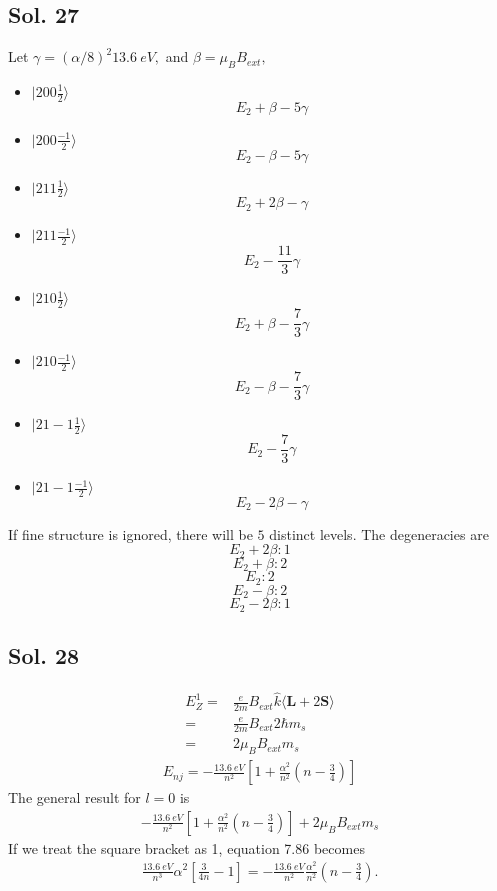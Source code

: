 \subsection*{Sol. 27}
Let $\gamma = (\alpha/8)^2\qty{13.6}{eV},$ and $\beta = \mu_BB_{ext},$
\begin{itemize}
    \item $|200\frac{1}{2}\rangle$
    $$
    E_2 + \beta - 5\gamma
    $$
    \item $|200\frac{-1}{2}\rangle$
    $$
    E_2 - \beta - 5\gamma
    $$
    \item $|211\frac{1}{2}\rangle$
    $$
    E_2 + 2\beta - \gamma
    $$
    \item $|211\frac{-1}{2}\rangle$
    $$
    E_2  - \frac{11}{3}\gamma
    $$
    \item $|210\frac{1}{2}\rangle$
    $$
    E_2 + \beta - \frac{7}{3}\gamma
    $$
    \item $|210\frac{-1}{2}\rangle$
    $$
    E_2 - \beta - \frac{7}{3}\gamma
    $$
    \item $|21-1\frac{1}{2}\rangle$
    $$
    E_2 - \frac{7}{3}\gamma
    $$
    \item $|21-1\frac{-1}{2}\rangle$
    $$
    E_2 - 2\beta - \gamma
    $$
\end{itemize}
If fine structure is ignored, there will be $5$ distinct levels. The degeneracies are
$$
E_2 + 2\beta: 1
$$
$$
E_2 + \beta: 2
$$
$$
E_2: 2
$$
$$
E_2 - \beta: 2
$$
$$
E_2 - 2\beta: 1
$$

\subsection*{Sol. 28}
\begin{align*}
    E^1_Z = &
    \frac{e}{2m}
    B_{ext}\hat k
    \langle \bm L+2\bm S\rangle\\
    =&\frac{e}{2m}B_{ext}2\hbar m_s\\
    =&2\mu_B B_{ext}m_s
\end{align*}
\begin{align*}
    E_{nj} = 
    -\frac{\qty{13.6}{eV}}{n^2}
    \left[
    1 + \frac{\alpha^2}{n^2}
    \left(
    n - \frac{3}{4}
    \right)
    \right]
\end{align*}
The general result for $l=0$ is 
\begin{align*}
    -\frac{\qty{13.6}{eV}}{n^2}
    \left[
    1 + \frac{\alpha^2}{n^2}
    \left(
    n - \frac{3}{4}
    \right)
    \right]
    +2\mu_B B_{ext}m_s
\end{align*}
If we treat the square bracket as 1, equation 7.86 becomes
\begin{align*}
    \frac{\qty{13.6}{eV}}{n^3}\alpha^2\left[
    \frac{3}{4n} - 1
    \right]=
    -\frac{\qty{13.6}{eV}}{n^2}
    \frac{\alpha^2}{n^2}
    \left(
    n-\frac{3}{4}
    \right).
\end{align*}

